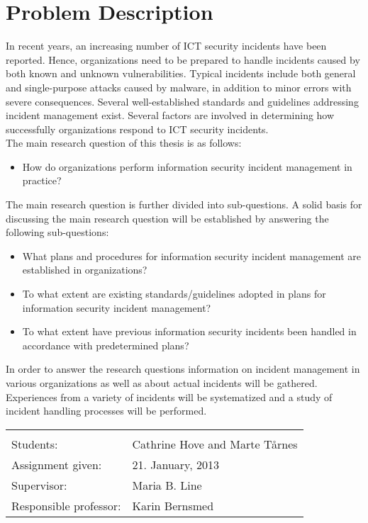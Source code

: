 \documentclass[b5paper, twoside, openright, 11pt]{report}
\begin{document}
\chapter*{Problem Description}
\vspace{-0.2cm}
In recent years, an increasing number of ICT security incidents have been reported. Hence, organizations need to be prepared to handle incidents caused by both known and unknown vulnerabilities. Typical incidents include both general and single-purpose attacks caused by malware, in addition to minor errors with severe consequences. Several well-established standards and guidelines addressing incident management exist. Several factors are involved in determining how successfully organizations respond to ICT security incidents. \\

The main research question of this thesis is as follows: 
\begin{itemize}
\item How do organizations perform information security incident management in practice?
\end{itemize}

The main research question is further divided into sub-questions. A solid basis for discussing the main research question will be established by answering the following sub-questions:\\

\begin{itemize}\itemsep-0.1cm
\item What plans and procedures for information security incident management are established in organizations?
\item To what extent are existing standards/guidelines adopted in plans for information security incident management?
\item To what extent have previous information security incidents been handled in accordance with predetermined plans? 
\end{itemize}

In order to answer the research questions information on incident management in various organizations as well as about actual incidents will be gathered. Experiences from a variety of incidents will be systematized and a study of incident handling processes will be performed.


\begin{tabular}{@{}p{4cm}l}
\vspace{0.1cm} & \vspace{0.1cm} \\
Students:		& Cathrine Hove and Marte T\aa rnes \\
Assignment given: & 21. January, 2013 \\
Supervisor:		& Maria B. Line \\
Responsible professor: 	& Karin Bernsmed 
\end{tabular}
\end{document}
